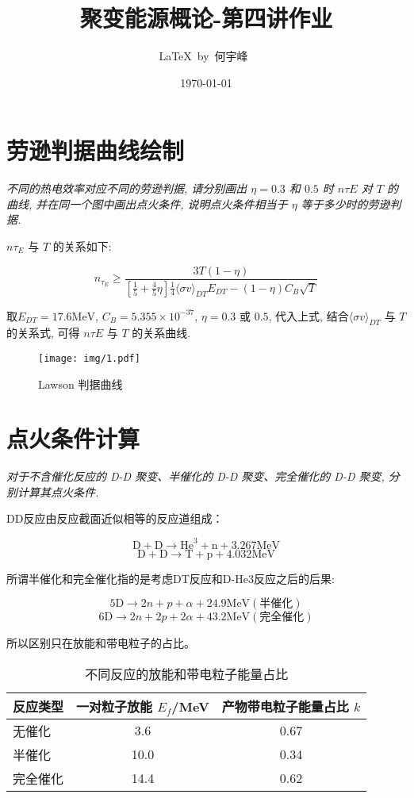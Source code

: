 \documentclass{article}
\title{聚变能源概论-第四讲作业}
\author{\LaTeX\ by\ 何宇峰\ }
\date{\today}
\begin{document}
\pagestyle{fancy}

\fancyhead[R]{\today}

\section{劳逊判据曲线绘制}
\emph{不同的热电效率对应不同的劳逊判据, 请分别画出 $\eta = 0.3$ 和 $0.5$ 时 $n\tau E$ 对 $T$ 的曲线, 并在同一个图中画出点火条件, 说明点火条件相当于 $\eta$ 等于多少时的劳逊判据. }

$n\tau_E$ 与 $T$ 的关系如下:

$$n_{\tau_E} \geq \frac{3T(1 - \eta)}{\left[\frac{1}{5} + \frac{4}{5}\eta\right]\frac{1}{4}\langle \sigma v \rangle_{DT} E_{DT} - (1 - \eta) C_B \sqrt{T}}$$

取$E_{DT} = 17.6 \text{MeV}$, $C_B = 5.355 \times 10^{-37}$, $\eta = 0.3$ 或 $0.5$, 代入上式, 结合$\langle \sigma v \rangle_{DT}$ 与 $T$ 的关系式, 可得 $n\tau E$ 与 $T$ 的关系曲线.

\begin{figure}[htpb]
    \centering
    \texttt{[image: img/1.pdf]}
    \caption{Lawson 判据曲线}
    \label{fig:1}
\end{figure}

\section{点火条件计算}
\emph{对于不含催化反应的 D-D 聚变、半催化的 D-D 聚变、完全催化的 D-D 聚变, 分别计算其点火条件. }

DD反应由反应截面近似相等的反应道组成：

$$\text{D} + \text{D} \rightarrow \text{He}^3 + \text{n} + 3.267 \text{MeV}$$
$$\text{D} + \text{D} \rightarrow \text{T} + \text{p} + 4.032 \text{MeV}$$

所谓半催化和完全催化指的是考虑DT反应和D-He3反应之后的后果:

$$ 5\text{D} \rightarrow 2n + p + \alpha + 24.9 \text{MeV} (\text{半催化})$$
$$ 6\text{D} \rightarrow 2n + 2p + 2\alpha + 43.2 \text{MeV} (\text{完全催化})$$

所以区别只在放能和带电粒子的占比。

\begin{table}[htpb]
    \centering
    \label{tab:reactions-and-energy}
    \begin{tabular}{|l|c|c|}
    \hline
    反应类型 & 一对粒子放能 $E_f$/MeV & 产物带电粒子能量占比 $k$ \\ \hline
    无催化 & 3.6 & 0.67 \\ \hline
    半催化 & 10.0 & 0.34 \\ \hline
    完全催化 & 14.4 & 0.62 \\ \hline
    \end{tabular}
    \caption{不同反应的放能和带电粒子能量占比}
\end{table}
\end{document}
